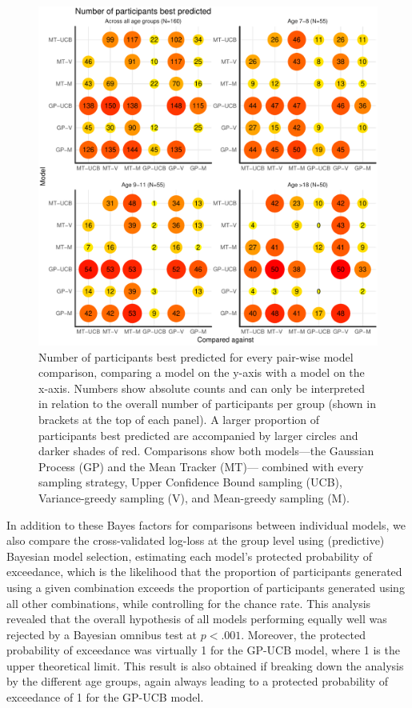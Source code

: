 \begin{figure}[ht!]
\centering
\includegraphics[width=0.8\linewidth]{bestdescribed.pdf}
\caption{Number of participants best predicted for every pair-wise model comparison, comparing a model on the y-axis with a model on the x-axis. Numbers show absolute counts and can only be interpreted in relation to the overall number of participants per group (shown in brackets at the top of each panel). A larger proportion of participants best predicted are accompanied by larger circles and darker shades of red. Comparisons show both models---the Gaussian Process (GP) and the Mean Tracker (MT)--- combined with every sampling strategy, Upper Confidence Bound sampling (UCB), Variance-greedy sampling (V), and Mean-greedy sampling (M).} 
\label{fig:bestpredict}
\vspace{-1mm}
\end{figure}

In addition to these Bayes factors for comparisons between individual models, we also compare the cross-validated log-loss at the group level using (predictive) Bayesian model selection, estimating each model's protected probability of exceedance, which is the likelihood that the proportion of participants generated using a given combination exceeds the proportion of participants generated using all other combinations, while controlling for the chance rate. This analysis revealed that the overall hypothesis of all models performing equally well was rejected by a Bayesian omnibus test at $p<.001$. Moreover, the protected probability of exceedance was virtually 1 for the GP-UCB model, where 1 is the upper theoretical limit. This result is also obtained if breaking down the analysis by the different age groups, again always leading to a protected probability of exceedance of 1 for the GP-UCB model.

